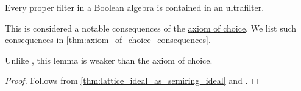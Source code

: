 \begin{lemma}\label{thm:ultrafilter_lemma}
  Every proper \hyperref[def:lattice_ideal]{filter} in a \hyperref[def:boolean_algebra]{Boolean algebra} is contained in an \hyperref[def:ultrafilter]{ultrafilter}.
\end{lemma}
\begin{comments}
  \item This is considered a notable consequences of the \hyperref[def:zfc/choice]{axiom of choice}. We list such consequences in \cref{thm:axiom_of_choice_consequences}.

  Unlike , this lemma is weaker than the axiom of choice.
\end{comments}
\begin{proof}
  Follows from \cref{thm:lattice_ideal_as_semiring_ideal} and .
\end{proof}
